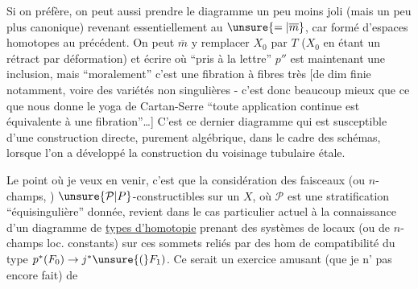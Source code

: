 Si on préfère, on peut aussi prendre le diagramme un peu moins joli (mais un peu plus canonique)
revenant essentiellement au $\unsure{=|\overline m}$, car formé d'espaces homotopes au précédent. On peut $\overline m$ y remplacer $X_0$ par $T$ ($X_0$ en étant un rétract par déformation) et écrire
où ``pris à la lettre'' $p''$ est maintenant une inclusion, mais ``moralement'' c'est  une fibration à fibres très  [de dim finie notamment, voire des variétés non singulières - c'est donc beaucoup mieux que ce que nous donne le yoga de Cartan-Serre ``toute application continue est équivalente à une fibration''\ldots] C'est ce dernier diagramme qui est susceptible d'une construction directe, purement algébrique, dans le cadre des schémas, lorsque l'on a développé la construction du voisinage tubulaire étale.

Le point où je veux en venir, c'est que la considération  des faisceaux (ou  $n$-champs, ) $\unsure{\mathcal P|P}$-constructibles sur un $X$, où $\mathcal P$ est une stratification ``équisingulière'' donnée, revient dans le cas particulier actuel à la connaissance d'un diagramme de \uline{types d'homotopie}  
 prenant des systèmes de  locaux (ou de $n$-champs loc. constants) sur ces sommets  reliés par des hom de compatibilité du type $p^*(F_0)\to j^*\unsure{(}F_1)$. Ce serait un exercice amusant (que je n' pas encore fait) de
